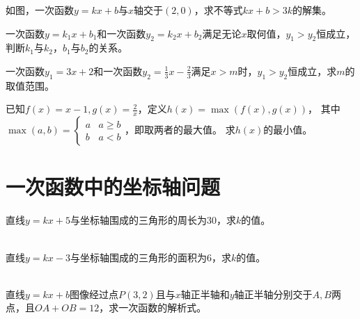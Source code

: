 \documentclass{ecnuthesis}
\begin{document}
\begin{problem}
    如图，一次函数$y=kx+b$与$x$轴交于$(2,0)$，求不等式$kx+b>3k$的解集。 \\
\end{problem}
\begin{problem}
    一次函数$y=k_1x+b_1$和一次函数$y_2=k_2x+b_2$满足无论$x$取何值，$y_1>y_2$恒成立，判断$k_1$与$k_2$，$b_1$与$b_2$的关系。\\
\end{problem}
\begin{problem}
    一次函数$y_1=3x+2$和一次函数$y_2=\frac{1}{3}x-\frac{2}{3}$满足$x>m$时，$y_1>y_2$恒成立，求$m$的取值范围。\\
\end{problem}
\begin{problem}
    已知$f(x)=x-1,g(x)=\frac{2}{x}$，定义$h(x)=\max(f(x),g(x))$，
    其中$\max(a,b)=\begin{cases} a & \text{$a \ge b$} \\ b & \text {$a<b$}\end{cases}$，即取两者的最大值。
    求$h(x)$的最小值。
\end{problem}
\clearpage
\section{一次函数中的坐标轴问题}
\begin{problem}
    直线$y=kx+5$与坐标轴围成的三角形的周长为30，求$k$的值。\\
    \\
\end{problem}
\begin{problem}
    直线$y=kx-3$与坐标轴围成的三角形的面积为6，求$k$的值。\\
    \\
\end{problem}
\begin{problem}
    直线$y=kx+b$图像经过点$P(3,2)$且与$x$轴正半轴和$y$轴正半轴分别交于$A,B$两点，且$OA+OB=12$，求一次函数的解析式。\\
    \\
\end{problem}
\clearpage
\end{document}
